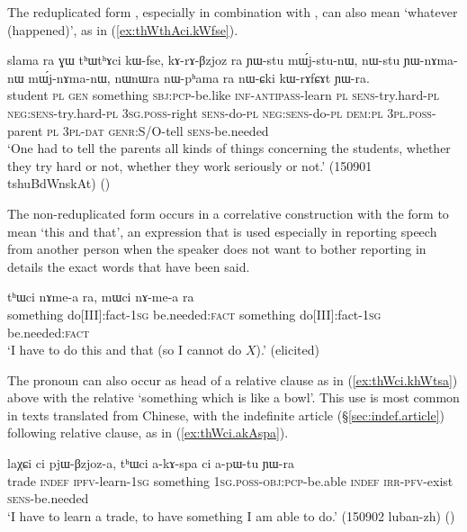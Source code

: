 The reduplicated form , especially in combination with , can also mean `whatever (happened)', as in (\ref{ex:thWthAci.kWfse}).
 
 \begin{exe}
\ex \label{ex:thWthAci.kWfse}
\gll  slama ra ɣɯ tʰɯtʰɤci kɯ-fse, kɤ-rɤ-βzjoz ra ɲɯ-stu mɯ́j-stu-nɯ, nɯ-stu ɲɯ-nɤma-nɯ mɯ́j-nɤma-nɯ,  nɯnɯra nɯ-pʰama ra nɯ-ɕki kɯ-rɤfɕɤt ɲɯ-ra. \\
student \textsc{pl} \textsc{gen} something \textsc{sbj}:\textsc{pcp}-be.like \textsc{inf}-\textsc{antipass}-learn \textsc{pl} \textsc{sens}-try.hard-\textsc{pl} \textsc{neg}:\textsc{sens}-try.hard-\textsc{pl} \textsc{3sg}.\textsc{poss}-right \textsc{sens}-do-\textsc{pl} \textsc{neg}:\textsc{sens}-do-\textsc{pl} \textsc{dem}:\textsc{pl} \textsc{3pl}.\textsc{poss}-parent \textsc{pl} \textsc{3pl}-\textsc{dat} \textsc{genr}:S/O-tell \textsc{sens}-be.needed \\
\glt `One had to tell the parents all kinds of things concerning the students, whether they try hard or not, whether they work seriously or not.'   (150901 tshuBdWnskAt) 
()
 \end{exe}
  
The non-reduplicated form  occurs in a correlative construction with the form  to mean `this and that', an expression that is used especially in reporting speech from another person when the speaker does not want to bother reporting in details the exact words that have been said.

\begin{exe}
\ex \label{ex:thWci.mWci}
\gll tʰɯci nɤme-a ra, mɯci nɤ-me-a ra \\
something do[III]:fact-\textsc{1sg} be.needed:\textsc{fact} something do[III]:fact-\textsc{1sg} be.needed:\textsc{fact} \\
\glt `I have to do this and that (so I cannot do $X$).' (elicited)
 \end{exe}
 
The pronoun   can also occur as head of a relative clause as in (\ref{ex:thWci.khWtsa}) above with the relative  `something which is like a bowl'. This use is most common in texts translated from Chinese, with the indefinite article  (§\ref{sec:indef.article}) following relative clause, as in (\ref{ex:thWci.akAspa}). 

\begin{exe}
\ex \label{ex:thWci.akAspa}
\gll  laχɕi ci pjɯ-βzjoz-a, tʰɯci a-kɤ-spa ci a-pɯ-tu ɲɯ-ra  \\
 trade \textsc{indef} \textsc{ipfv}-learn-\textsc{1sg} something \textsc{1sg}.\textsc{poss}-\textsc{obj}:\textsc{pcp}-be.able \textsc{indef} \textsc{irr}-\textsc{pfv}-exist \textsc{sens}-be.needed \\
 \glt `I have to learn a trade, to have something I am able to do.' (150902 luban-zh)
()
\end{exe}
 
